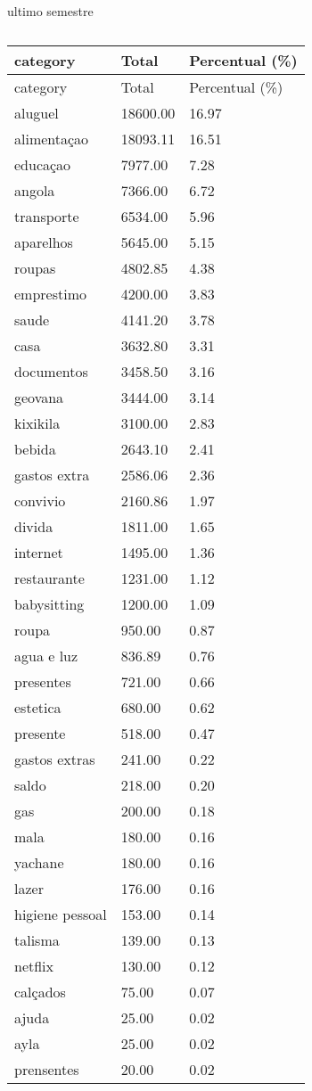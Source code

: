 \documentclass[
  8pt,
  a4paper,
  DIV=11,
  numbers=noendperiod]{scrartcl}
\begin{document}
\begin{figure}
\begin{minipage}{0.50\linewidth}
\end{minipage}%
%
\begin{minipage}{0.50\linewidth}
ultimo semestre

\begin{longtable}[]{@{}lll@{}}
\caption{}\label{T_11723}\tabularnewline
\toprule\noalign{}
category & Total & Percentual (\%) \\
\midrule\noalign{}
\endfirsthead
\toprule\noalign{}
category & Total & Percentual (\%) \\
\midrule\noalign{}
\endhead
\bottomrule\noalign{}
\endlastfoot
aluguel & 18600.00 & 16.97 \\
alimentaçao & 18093.11 & 16.51 \\
educaçao & 7977.00 & 7.28 \\
angola & 7366.00 & 6.72 \\
transporte & 6534.00 & 5.96 \\
aparelhos & 5645.00 & 5.15 \\
roupas & 4802.85 & 4.38 \\
emprestimo & 4200.00 & 3.83 \\
saude & 4141.20 & 3.78 \\
casa & 3632.80 & 3.31 \\
documentos & 3458.50 & 3.16 \\
geovana & 3444.00 & 3.14 \\
kixikila & 3100.00 & 2.83 \\
bebida & 2643.10 & 2.41 \\
gastos extra & 2586.06 & 2.36 \\
convivio & 2160.86 & 1.97 \\
divida & 1811.00 & 1.65 \\
internet & 1495.00 & 1.36 \\
restaurante & 1231.00 & 1.12 \\
babysitting & 1200.00 & 1.09 \\
roupa & 950.00 & 0.87 \\
agua e luz & 836.89 & 0.76 \\
presentes & 721.00 & 0.66 \\
estetica & 680.00 & 0.62 \\
presente & 518.00 & 0.47 \\
gastos extras & 241.00 & 0.22 \\
saldo & 218.00 & 0.20 \\
gas & 200.00 & 0.18 \\
mala & 180.00 & 0.16 \\
yachane & 180.00 & 0.16 \\
lazer & 176.00 & 0.16 \\
higiene pessoal & 153.00 & 0.14 \\
talisma & 139.00 & 0.13 \\
netflix & 130.00 & 0.12 \\
calçados & 75.00 & 0.07 \\
ajuda & 25.00 & 0.02 \\
ayla & 25.00 & 0.02 \\
prensentes & 20.00 & 0.02 \\
\end{longtable}


\end{minipage}
\end{figure}
\end{document}
